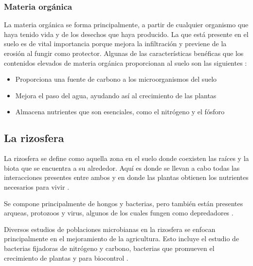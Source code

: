 \documentclass[12pt,letterpaper,oneside]{report}
\begin{document}
\subsubsection{Materia orgánica}
La materia orgánica se forma principalmente, a partir de cualquier organismo que haya tenido vida y de los desechos que haya producido. La que está presente en el suelo es de vital importancia porque mejora la infiltración y previene de la erosión al fungir como protector. Algunas de las características benéficas que los contenidos elevados de materia orgánica proporcionan al suelo son las siguientes \autocite{Chaudhari2013,Lindbo2012}:
\begin{itemize}
\item Proporciona una fuente de carbono a los microorganismos del suelo
\item Mejora el paso del agua, ayudando así al crecimiento de las plantas
\item Almacena nutrientes que son esenciales, como el nitrógeno y el fósforo
\end{itemize}
\subsection{La rizosfera}
La rizosfera se define como aquella zona en el suelo donde coexisten las raíces y la biota que se encuentra a su alrededor. Aquí es donde se llevan a cabo todas las interacciones presentes entre ambos y en donde las plantas obtienen los nutrientes necesarios para vivir \autocite{Larsen2015,Lynch2012}.
\par
Se compone principalmente de hongos y bacterias, pero también están presentes arqueas, protozoos y virus, algunos de los cuales fungen como depredadores \autocite{Cardon2007}.
\par
Diversos estudios de poblaciones microbianas en la rizosfera se enfocan principalmente en el mejoramiento de la agricultura. Esto incluye el estudio de bacterias fijadoras de nitrógeno y carbono, bacterias que promueven el crecimiento de plantas y para biocontrol \autocite{Compant2005,Vejan2016}.
\newpage
\end{document}
